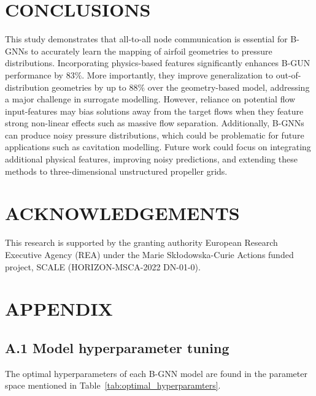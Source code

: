 \documentclass{marine_2025_paper_template}
\begin{document}

\section{CONCLUSIONS}

This study demonstrates that all-to-all node communication is essential for B-GNNs to accurately learn the mapping of airfoil geometries to pressure distributions. Incorporating physics-based features significantly enhances B-GUN performance by $83\%$. More importantly, they improve generalization to out-of-distribution geometries by up to $88\%$ over the geometry-based model, addressing a major challenge in surrogate modelling. However, reliance on potential flow input-features may bias solutions away from the target flows when they feature strong non-linear effects such as massive flow separation. Additionally, B-GNNs can produce noisy pressure distributions, which could be problematic for future applications such as cavitation modelling. Future work could focus on integrating additional physical features, improving noisy predictions, and extending these methods to three-dimensional unstructured propeller grids.\newline

\section*{ACKNOWLEDGEMENTS}

This research is supported by the granting authority European Research Executive Agency (REA) under the Marie Skłodowska-Curie Actions funded project, SCALE (HORIZON-MSCA-2022 DN-01-0). 


\section*{APPENDIX}

\subsection*{A.1 Model hyperparameter tuning}

The optimal hyperparameters of each B-GNN model are found in the parameter space mentioned in Table~\ref{tab:optimal_hyperparamters}.
\end{document}
